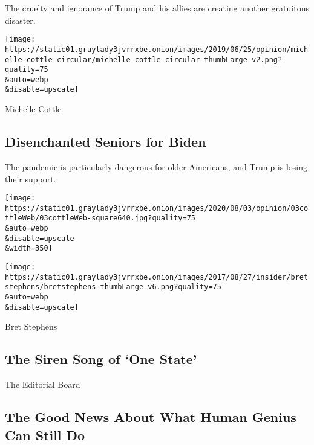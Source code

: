 The cruelty and ignorance of Trump and his allies are creating another
gratuitous disaster.

\href{/2020/08/03/opinion/senior-voters-biden-trump-2020.html}{}

\texttt{[image: https://static01.graylady3jvrrxbe.onion/images/2019/06/25/opinion/michelle-cottle-circular/michelle-cottle-circular-thumbLarge-v2.png?quality=75\\\&auto=webp\\\&disable=upscale]}

Michelle Cottle

\hypertarget{disenchanted-seniors-for-biden}{%
\subsection{Disenchanted Seniors for
Biden}\label{disenchanted-seniors-for-biden}}

The pandemic is particularly dangerous for older Americans, and Trump is
losing their support.

\href{/2020/08/03/opinion/senior-voters-biden-trump-2020.html}{}

\texttt{[image: https://static01.graylady3jvrrxbe.onion/images/2020/08/03/opinion/03cottleWeb/03cottleWeb-square640.jpg?quality=75\\\&auto=webp\\\&disable=upscale\\\&width=350]}

\href{/2020/08/03/opinion/israel-palestine-one-state-solution.html}{}

\texttt{[image: https://static01.graylady3jvrrxbe.onion/images/2017/08/27/insider/bretstephens/bretstephens-thumbLarge-v6.png?quality=75\\\&auto=webp\\\&disable=upscale]}

Bret Stephens

\hypertarget{the-siren-song-of-one-state}{%
\subsection{The Siren Song of `One
State'}\label{the-siren-song-of-one-state}}

\href{/2020/08/03/opinion/spacex-stonehenge-mars.html}{}

The Editorial Board

\hypertarget{the-good-news-about-what-human-genius-can-still-do}{%
\subsection{The Good News About What Human Genius Can Still
Do}\label{the-good-news-about-what-human-genius-can-still-do}}

\href{/2020/08/03/opinion/trump-biden-2020.html}{}

